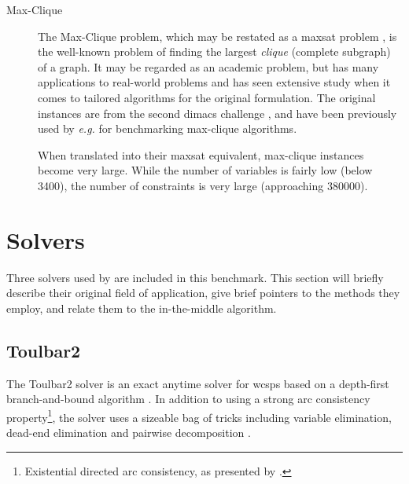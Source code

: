 \begin{description}
	\item[Max-Clique]
		The Max-Clique problem, which may be restated as a \gls{maxsat} problem \parencite{Heras08}, is the well-known problem of finding the largest \emph{clique} (complete subgraph) of a graph.
		It may be regarded as an academic problem, but has many applications to real-world problems and has seen extensive study when it comes to tailored algorithms for the original formulation.
		The original instances are from the second \gls{dimacs} challenge \parencite{Johnson96}, and have been previously used by \emph{e.g.} \textcite{Östergård02} for benchmarking max-clique algorithms.

		When translated into their \gls{maxsat} equivalent, max-clique instances become very large. While the number of variables is fairly low (below \num{3400}), the number of constraints is very large (approaching \num{380000}).
\end{description}

\clearpage %
\section{Solvers}
Three solvers used by \textcite{deGivry14} are included in this benchmark.
This section will briefly describe their original field of application, give brief pointers to the methods they employ, and relate them to the in-the-middle algorithm.

\subsection{Toulbar2}
The Toulbar2 solver is an exact anytime solver for \glspl{wcsp} based on a depth-first branch-and-bound algorithm \parencite{Allouche10}.
In addition to using a strong arc consistency property\footnote{Existential directed arc consistency, as presented by \textcite{deGivry05}.}, the solver uses a sizeable bag of tricks including variable elimination, dead-end elimination \parencite{deGivry13} and pairwise decomposition \parencite{Favier11}.

